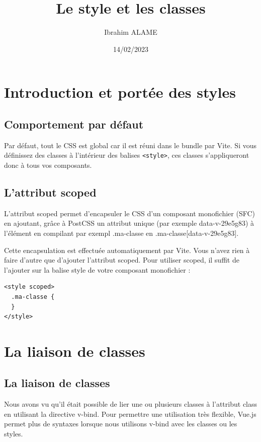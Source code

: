 \documentclass{article}
\title{Le style et les classes}
\author{Ibrahim ALAME}
\date{14/02/2023}
\begin{document}
\maketitle

\section{Introduction et portée des styles}
\subsection{Comportement par défaut}
Par défaut, tout le CSS est global car il est réuni dans le {\color{monOrange}bundle} par {\color{monOrange}Vite}. Si vous définissez des classes à l'intérieur des balises {\tt <style>}, ces classes s'appliqueront donc à tous vos composants.

\subsection{L'attribut {\color{monOrange}scoped}}
L'attribut {\color{monOrange}scoped} permet d'encapsuler le CSS d'un composant monofichier ({\color{monOrange}SFC}) en ajoutant, grâce à PostCSS un attribut unique (par exemple data-v-29e5g83) à l'élément en compilant par exempl {\color{monOrange}.ma-classe} en {\color{monOrange}.ma-classe[data-v-29e5g83]}.

Cette encapsulation est effectuée automatiquement par {\color{monOrange}Vite}. Vous n'avez rien à faire d'autre que d'ajouter l'attribut {\color{monOrange}scoped}. Pour utiliser {\color{monOrange}scoped}, il suffit de l'ajouter sur la balise style de votre composant monofichier :
\begin{verbatim}
<style scoped>
  .ma-classe {
  }
</style>
\end{verbatim}


\section{La liaison de classes}
\subsection{La liaison de classes}
Nous avons vu qu'il était possible de lier une ou plusieurs classes à l'attribut {\color{monOrange}class} en utilisant la directive {\color{monOrange}v-bind}. Pour permettre une utilisation très flexible, {\color{monOrange}Vue.js} permet plus de syntaxes lorsque nous utilisons {\color{monOrange}v-bind} avec les classes ou les styles.
\end{document}
